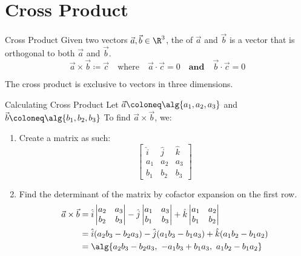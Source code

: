 \section{Cross Product}

\begin{dfnbox}{Cross Product}{}
    Given two vectors $\vec{a}, \vec{b} \in \R^3$, the  of $\vec{a}$ and $\vec{b}$ is a vector that is orthogonal to both $\vec{a}$ and $\vec{b}$.
    \tcblower
    \[ \vec{a} \times \vec{b} \coloneq \vec{c} \quad \text{where} \quad \vec{a} \cdot \vec{c} = 0 \quad \textbf{and} \quad \vec{b} \cdot \vec{c} = 0 \]
\end{dfnbox}

The cross product is exclusive to vectors in three dimensions.

\begin{tecbox}{Calculating Cross Product}{}
Let $\vec{a} \coloneq \alg{a_1, a_2, a_3}$ and $\vec{b} \coloneq \alg{b_1, b_2, b_3}$ To find $\vec{a} \times \vec{b}$, we:
\begin{enumerate}
    \item Create a matrix as such:
    \[ \begin{bmatrix}
        \hat{i} & \hat{j} & \hat{k} \\
        a_1 & a_2 & a_3 \\
        b_1 & b_2 & b_3
    \end{bmatrix} \]
    \item Find the determinant of the matrix by cofactor expansion on the first row.
    \begin{align*}
        \vec{a} \times \vec{b} &= \hat{i} \begin{vmatrix} a_2 & a_3 \\ b_2 & b_3 \end{vmatrix} - \hat{j} \begin{vmatrix} a_1 & a_3 \\ b_1 & b_3 \end{vmatrix} + \hat{k} \begin{vmatrix} a_1 & a_2 \\ b_1 & b_2 \end{vmatrix} \\
        &= \hat{i}(a_2b_3 - b_2a_3) - \hat{j}(a_1b_3 - b_1a_3) + \hat{k}(a_1b_2 - b_1a_2) \\
        &= \alg{ a_2b_3 - b_2a_3 ,\  -a_1b_3 + b_1a_3 ,\  a_1b_2 - b_1a_2 }
    \end{align*}
\end{enumerate}
\end{tecbox}


